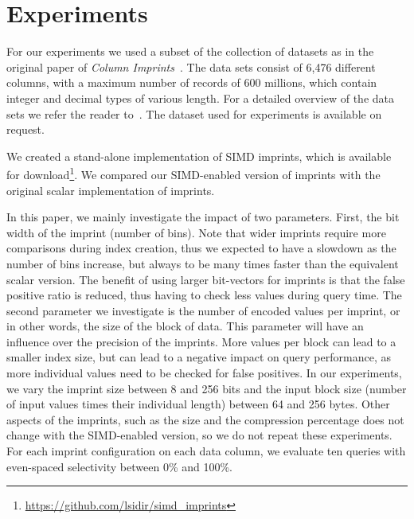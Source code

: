 \documentclass[sigconf]{acmart}
\begin{document}
\section{Experiments}\label{sec:experiments}

For our experiments we used a subset of the collection of datasets as in the original paper of {\em Column Imprints}~\cite{DBLP:conf/sigmod/SidirourgosK13}. The data sets consist of 6,476 different columns, with a maximum number of records of 600 millions, which contain integer and decimal types of various length. For a detailed overview of the data sets we refer
the reader to~\cite{DBLP:conf/sigmod/SidirourgosK13}. The dataset used for experiments is available on request.

We created a stand-alone implementation of SIMD imprints, which is available for download\footnote{\url{https://github.com/lsidir/simd_imprints}}. We compared our SIMD-enabled version of imprints with the original scalar implementation of imprints.

In this paper, we mainly investigate the impact of two parameters. First, the bit width of the imprint (number of bins). Note that wider imprints require more comparisons during index creation, thus we expected to have a slowdown as the number of bins increase, but always to be many times faster than the equivalent scalar version. The benefit of using larger bit-vectors for imprints is that the false positive ratio is reduced, thus having to check less values during query time. The second parameter we investigate is the number of encoded values per imprint, or in other words, the size of the block of data. This parameter will have an influence over the precision of the imprints. More values per block can lead to a smaller index size, but can lead to a negative impact on query performance, as more individual values need to be checked for false positives. In our experiments, we vary the imprint size between 8 and 256 bits and the input block size (number of input values times their individual length) between 64 and 256 bytes. Other aspects of the imprints, such as the size and the compression percentage does not change with the SIMD-enabled version, so we do not repeat these experiments. For each imprint configuration on each data column, we evaluate ten queries with even-spaced selectivity between 0\% and 100\%.
\end{document}
